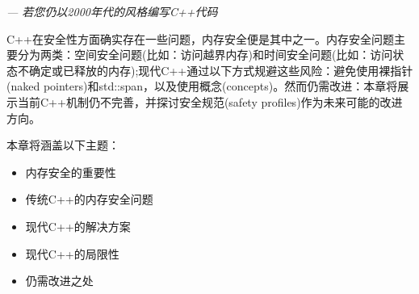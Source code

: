 \begin{flushright}
\textit{--- 若您仍以2000年代的风格编写C++代码}
\end{flushright}


C++在安全性方面确实存在一些问题，内存安全便是其中之一。内存安全问题主要分为两类：空间安全问题(比如：访问越界内存)和时间安全问题(比如：访问状态不确定或已释放的内存);现代C++通过以下方式规避这些风险：避免使用裸指针(naked pointers)和std::span，以及使用概念(concepts)。然而仍需改进：本章将展示当前C++机制仍不完善，并探讨安全规范(safety profiles)作为未来可能的改进方向。

本章将涵盖以下主题：

\begin{itemize}
\item 
内存安全的重要性

\item 
传统C++的内存安全问题

\item 
现代C++的解决方案

\item 
现代C++的局限性

\item 
仍需改进之处
\end{itemize}















